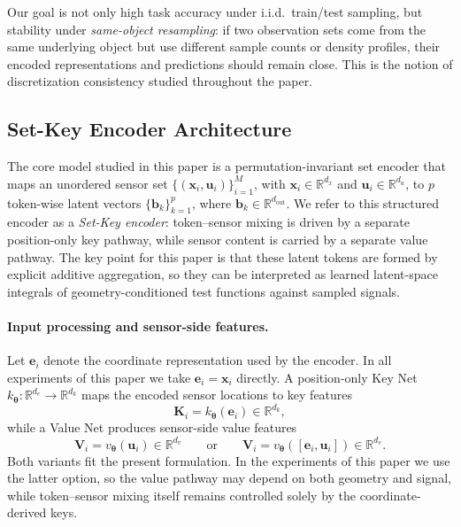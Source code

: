 \documentclass[11pt]{article}
\begin{document}
Our goal is not only high task accuracy under i.i.d.\ train/test sampling, but
stability under \emph{same-object resampling}: if two observation sets come
from the same underlying object but use different sample counts or density
profiles, their encoded representations and predictions should remain close.
This is the notion of discretization consistency studied throughout the paper.

\subsection{Set-Key Encoder Architecture}
\label{sec:method-architecture}

The core model studied in this paper is a permutation-invariant set encoder
that maps an unordered sensor set
$\{(\boldsymbol{x}_i,\boldsymbol{u}_i)\}_{i=1}^M$, with
$\boldsymbol{x}_i\in\mathbb{R}^{d_x}$ and
$\boldsymbol{u}_i\in\mathbb{R}^{d_u}$, to $p$ token-wise latent vectors
$\{\boldsymbol{b}_k\}_{k=1}^{p}$, where
$\boldsymbol{b}_k\in\mathbb{R}^{d_{\mathrm{out}}}$.  We refer to this structured encoder as a
\emph{Set-Key encoder}: token--sensor mixing is driven by a separate
position-only key pathway, while sensor content is carried by a separate value
pathway.  The key point for this paper is that these latent tokens are formed
by explicit additive aggregation, so they can be interpreted as learned
latent-space integrals of geometry-conditioned test functions against sampled
signals.

\paragraph{Input processing and sensor-side features.}
Let $\boldsymbol{e}_i$ denote the coordinate representation used by the
encoder.  In all experiments of this paper we take
$\boldsymbol{e}_i=\boldsymbol{x}_i$ directly.  A position-only Key Net
$k_{\boldsymbol{\theta}}:\mathbb{R}^{d_e}\to\mathbb{R}^{d_k}$ maps the encoded
sensor locations to key features
\[
\boldsymbol{K}_i = k_{\boldsymbol{\theta}}(\boldsymbol{e}_i)\in\mathbb{R}^{d_k},
\]
while a Value Net produces sensor-side value features
\[
\boldsymbol{V}_i = v_{\boldsymbol{\theta}}(\boldsymbol{u}_i)\in\mathbb{R}^{d_v}
\qquad\text{or}\qquad
\boldsymbol{V}_i = v_{\boldsymbol{\theta}}([\boldsymbol{e}_i,\boldsymbol{u}_i])\in\mathbb{R}^{d_v}.
\]
Both variants fit the present formulation.  In the experiments of this paper
we use the latter option, so the value pathway may depend on both geometry and
signal, while token--sensor mixing itself remains controlled solely by the
coordinate-derived keys.
\end{document}
